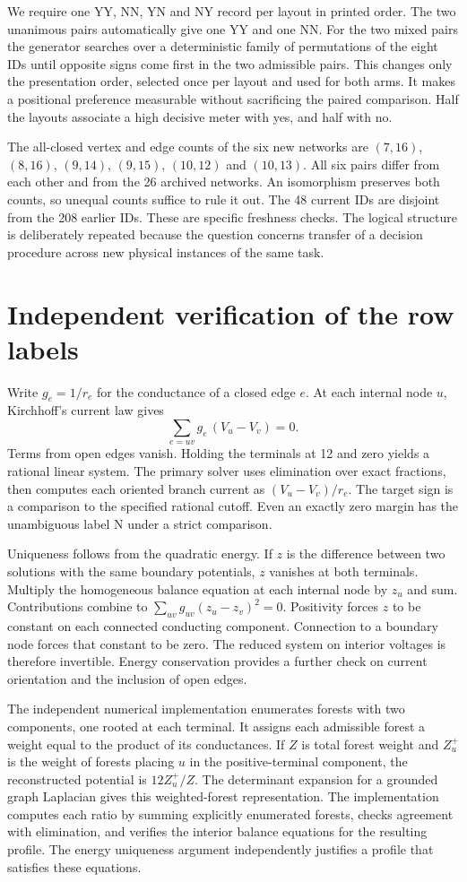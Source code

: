 \documentclass[12pt,letterpaper]{article}
\begin{document}
We require one YY, NN, YN and NY record per layout in printed order. The two unanimous pairs automatically give one YY and one NN. For the two mixed pairs the generator searches over a deterministic family of permutations of the eight IDs until opposite signs come first in the two admissible pairs. This changes only the presentation order, selected once per layout and used for both arms. It makes a positional preference measurable without sacrificing the paired comparison. Half the layouts associate a high decisive meter with yes, and half with no.

The all-closed vertex and edge counts of the six new networks are $(7,16)$, $(8,16)$, $(9,14)$, $(9,15)$, $(10,12)$ and $(10,13)$. All six pairs differ from each other and from the 26 archived networks. An isomorphism preserves both counts, so unequal counts suffice to rule it out. The 48 current IDs are disjoint from the 208 earlier IDs. These are specific freshness checks. The logical structure is deliberately repeated because the question concerns transfer of a decision procedure across new physical instances of the same task.

\section{Independent verification of the row labels}
Write $g_e=1/r_e$ for the conductance of a closed edge $e$. At each internal node $u$, Kirchhoff's current law gives
\[
 \sum_{e=uv}g_e\,(V_u-V_v)=0 .
\]
Terms from open edges vanish. Holding the terminals at 12 and zero yields a rational linear system. The primary solver uses elimination over exact fractions, then computes each oriented branch current as $(V_u-V_v)/r_e$. The target sign is a comparison to the specified rational cutoff. Even an exactly zero margin has the unambiguous label N under a strict comparison.

Uniqueness follows from the quadratic energy. If $z$ is the difference between two solutions with the same boundary potentials, $z$ vanishes at both terminals. Multiply the homogeneous balance equation at each internal node by $z_u$ and sum. Contributions combine to $\sum_{uv}g_{uv}(z_u-z_v)^2=0$. Positivity forces $z$ to be constant on each connected conducting component. Connection to a boundary node forces that constant to be zero. The reduced system on interior voltages is therefore invertible. Energy conservation provides a further check on current orientation and the inclusion of open edges.

The independent numerical implementation enumerates forests with two components, one rooted at each terminal. It assigns each admissible forest a weight equal to the product of its conductances. If $Z$ is total forest weight and $Z^+_u$ is the weight of forests placing $u$ in the positive-terminal component, the reconstructed potential is $12Z^+_u/Z$. The determinant expansion for a grounded graph Laplacian gives this weighted-forest representation. The implementation computes each ratio by summing explicitly enumerated forests, checks agreement with elimination, and verifies the interior balance equations for the resulting profile. The energy uniqueness argument independently justifies a profile that satisfies these equations.
\end{document}
